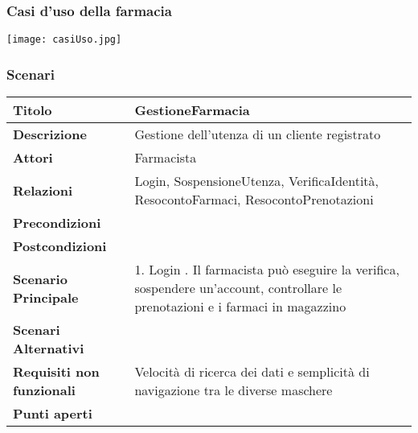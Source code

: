 \newpage %
\subsubsection{Casi d'uso della farmacia}

\texttt{[image: casiUso.jpg]}

\newpage %
\subsubsection{Scenari}

\begin{tabular} {|P{4.5cm}|P{12.5cm}|}
\hline  
  \textbf{Titolo} & GestioneFarmacia \\
\hline
  \textbf{Descrizione} & Gestione dell'utenza di un cliente registrato \\
\hline
  \textbf{Attori} & Farmacista\\
\hline
  \textbf{Relazioni} & Login, SospensioneUtenza, VerificaIdentità, ResocontoFarmaci, ResocontoPrenotazioni\\
\hline
  \textbf{Precondizioni} & \\
\hline
  \textbf{Postcondizioni} & \\
\hline
  \textbf{Scenario Principale} & 1. Login . Il farmacista può eseguire la verifica, sospendere un'account, controllare le prenotazioni e i farmaci in magazzino\\
\hline
  \textbf{Scenari Alternativi} &\\
\hline
  \textbf{Requisiti non funzionali} & Velocità di ricerca dei dati e semplicità di navigazione tra le diverse maschere\\
\hline
  \textbf{Punti aperti} &\\
\hline
\end{tabular}
\hfill
\break

